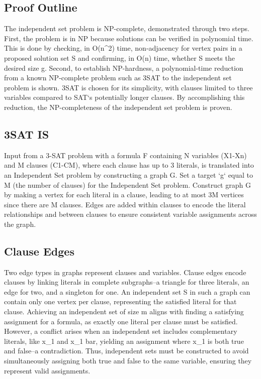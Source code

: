 \subsection*{Proof Outline}
The independent set problem is NP-complete, demonstrated through two steps.
First, the problem is in NP because solutions can be verified in polynomial time.
This is done by checking, in O(n\textasciicircum{}2) time, non-adjacency for vertex pairs in a proposed solution set S and confirming, in O(n) time, whether S meets the desired size g.
Second, to establish NP-hardness, a polynomial-time reduction from a known NP-complete problem such as 3SAT to the independent set problem is shown.
3SAT is chosen for its simplicity, with clauses limited to three variables compared to SAT`s potentially longer clauses.
By accomplishing this reduction, the NP-completeness of the independent set problem is proven.

\subsection*{3SAT  IS}
Input from a 3-SAT problem with a formula F containing N variables (X1-Xn) and M clauses (C1-CM), where each clause has up to 3 literals, is translated into an Independent Set problem by constructing a graph G\@.
Set a target `g` equal to M (the number of clauses) for the Independent Set problem.
Construct graph G by making a vertex for each literal in a clause, leading to at most 3M vertices since there are M clauses.
Edges are added within clauses to encode the literal relationships and between clauses to ensure consistent variable assignments across the graph.

\subsection*{Clause Edges}
Two edge types in graphs represent clauses and variables.
Clause edges encode clauses by linking literals in complete subgraphs--a triangle for three literals, an edge for two, and a singleton for one.
An independent set S in such a graph can contain only one vertex per clause, representing the satisfied literal for that clause.
Achieving an independent set of size m aligns with finding a satisfying assignment for a formula, as exactly one literal per clause must be satisfied.
However, a conflict arises when an independent set includes complementary literals, like x\_1 and x\_1 bar, yielding an assignment where x\_1 is both true and false--a contradiction.
Thus, independent sets must be constructed to avoid simultaneously assigning both true and false to the same variable, ensuring they represent valid assignments.

